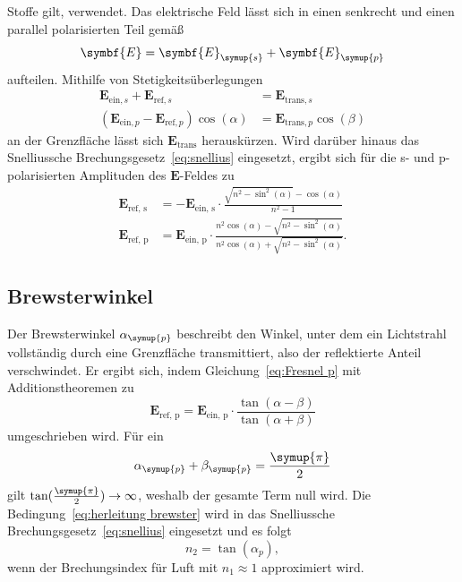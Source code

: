Stoffe gilt, verwendet.
Das elektrische Feld lässt sich in einen senkrecht und einen parallel polarisierten Teil gemäß
\begin{equation*}
    \symbf{E} = \symbf{E}_{\symup{s}} + \symbf{E}_{\symup{p}}
\end{equation*}
aufteilen. Mithilfe von Stetigkeitsüberlegungen 
\begin{align*}
    \symbf{E}_{\text{ein}, s} + \symbf{E}_{\text{ref}, s} &= \symbf{E}_{\text{trans}, s} \\
    (\symbf{E}_{\text{ein}, p} - \symbf{E}_{\text{ref}, p})\cos(\alpha) &= \symbf{E}_{\text{trans}, p} \cos(\beta)
\end{align*}
an der Grenzfläche lässt sich $\symbf{E}_{\text{trans}}$ herauskürzen. Wird darüber hinaus das Snelliussche
Brechungsgesetz~\eqref{eq:snellius} eingesetzt, ergibt sich für die s- und p-polarisierten Amplituden des 
$\symbf{E}$-Feldes zu
\begin{align}
    \symbf{E}_{\text{ref, s}} &= -\symbf{E}_{\text{ein, s}} \cdot \frac{\sqrt{n^2-\sin^2(\alpha)}-\cos(\alpha)}{n^2-1}
    \label{eq:Fresnel s} \\
    \symbf{E}_{\text{ref, p}} &= \symbf{E}_{\text{ein, p}} \cdot \frac{n^2 \cos(\alpha) - \sqrt{n^2-\sin^2(\alpha)}}{n^2 \cos(\alpha) + \sqrt{n^2-\sin^2(\alpha)}}.
    \label{eq:Fresnel p}
\end{align}

\subsection{Brewsterwinkel}
Der Brewsterwinkel $\alpha_{\symup{p}}$ beschreibt den Winkel, unter dem ein Lichtstrahl vollständig durch
eine Grenzfläche transmittiert, also der reflektierte Anteil verschwindet. Er ergibt sich, indem 
Gleichung~\eqref{eq:Fresnel p} mit Additionstheoremen zu
\begin{equation*}
    \symbf{E}_{\text{ref, p}} = \symbf{E}_{\text{ein, p}} \cdot \frac{\tan(\alpha-\beta)}{\tan(\alpha+\beta)}
\end{equation*}
umgeschrieben wird. Für ein 
\begin{equation}
    \alpha_{\symup{p}}+\beta_{\symup{p}}=\frac{\symup{\pi}}{2}
    \label{eq:herleitung brewster}
\end{equation}
gilt $\tan(\frac{\symup{\pi}}{2}) \to \infty$, 
weshalb der gesamte Term null wird. Die Bedingung~\eqref{eq:herleitung brewster} wird in das Snelliussche
Brechungsgesetz~\eqref{eq:snellius} eingesetzt und es folgt
\begin{equation}
    n_2 = \tan(\alpha_p),
    \label{eq:Brewsterwinkel}
\end{equation}
wenn der Brechungsindex für Luft mit $n_1\approx 1$ approximiert wird.